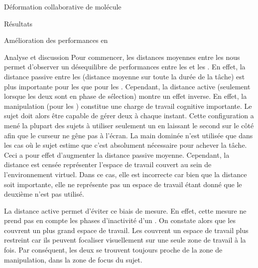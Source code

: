 \documentclass[myfrancais]{mythesis}
\begin{document}
\begin{mychapter}{Déformation collaborative de molécule}
\begin{mysection}{Résultats}
\begin{mysubsection}{Amélioration des performances en }
\begin{mysubsubsection}{Analyse et discussion}
					Pour commencer, les distances moyennes entre les  nous permet d'observer un désequilibre de performances entre les  et les  .
					En effet, la distance passive entre les  (distance moyenne sur toute la durée de la tâche) est plus importante pour les  que pour les .
					Cependant, la distance active (seulement lorsque les deux  sont en phase de sélection) montre un effet inverse.
					En effet, la manipulation  (pour les ) constitue une charge de travail cognitive importante.
					Le sujet doit alors être capable de gérer deux  à chaque instant.
					Cette configuration a mené la plupart des sujets à utiliser seulement un  en laissant le second sur le côté afin que le curseur ne gêne pas à l'écran.
					La main dominée n'est utilisée que dans les cas où le sujet estime que c'est absolument nécessaire pour achever la tâche.
					Ceci a pour effet d'augmenter la distance passive moyenne.
					Cependant, la distance est censée représenter l'espace de travail couvert au sein de l'environnement virtuel.
					Dans ce cas, elle est incorrecte car bien que la distance soit importante, elle ne représente pas un espace de travail étant donné que le deuxième  n'est pas utilisé.

					La distance active permet d'éviter ce biais de mesure.
					En effet, cette mesure ne prend pas en compte les phases d'inactivité d'un .
					On constate alors que les  couvrent un plus grand espace de travail.
					Les  couvrent un espace de travail plus restreint car ils peuvent focaliser visuellement sur une seule zone de travail à la fois.
					Par conséquent, les deux  se trouvent toujours proche de la zone de manipulation, dans la zone de focus du sujet.


\end{mysubsubsection}
\end{mysubsection}
\end{mysection}
\end{mychapter}
\end{document}
